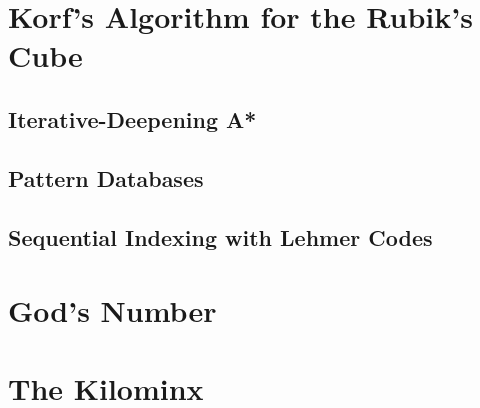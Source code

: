 
\section{Korf's Algorithm for the Rubik's Cube}
\subsection{Iterative-Deepening A*}
\subsection{Pattern Databases}

\subsection{Sequential Indexing with Lehmer Codes}

\section{God's Number}

\section{The Kilominx}
